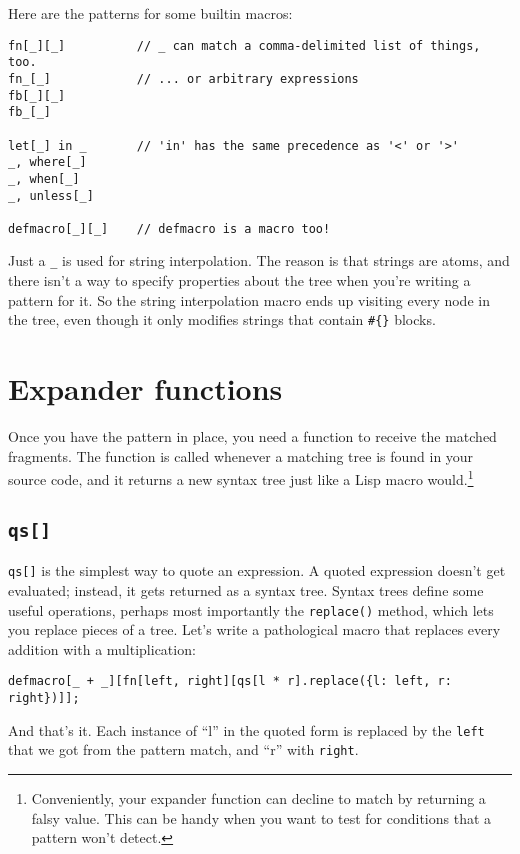 \documentclass{report}
\begin{document}
    Here are the patterns for some builtin macros:

\begin{verbatim}
fn[_][_]          // _ can match a comma-delimited list of things, too.
fn_[_]            // ... or arbitrary expressions
fb[_][_]
fb_[_]

let[_] in _       // 'in' has the same precedence as '<' or '>'
_, where[_]
_, when[_]
_, unless[_]

defmacro[_][_]    // defmacro is a macro too!
\end{verbatim}

    Just a \verb|_| is used for string interpolation. The reason is that strings are atoms, and there isn't a way to specify properties about the tree when you're writing a pattern for it. So
    the string interpolation macro ends up visiting every node in the tree, even though it only modifies strings that contain \verb|#{}| blocks.

\section{Expander functions}\label{sec:defining-macros-expander-functions}
    Once you have the pattern in place, you need a function to receive the matched fragments. The function is called whenever a matching tree is found in your source code, and it returns a new
    syntax tree just like a Lisp macro would.\footnote{Conveniently, your expander function can decline to match by returning a falsy value. This can be handy when you want to test for
    conditions that a pattern won't detect.}

\subsection{{\tt qs[]}}\label{sec:defining-macros-expander-functions-qs}
      {\tt qs[]} is the simplest way to quote an expression. A quoted expression doesn't get evaluated; instead, it gets returned as a syntax tree. Syntax trees define some useful operations,
      perhaps most importantly the {\tt replace()} method, which lets you replace pieces of a tree. Let's write a pathological macro that replaces every addition with a multiplication:

\begin{verbatim}
defmacro[_ + _][fn[left, right][qs[l * r].replace({l: left, r: right})]];
\end{verbatim}

      And that's it. Each instance of ``l'' in the quoted form is replaced by the {\tt left} that we got from the pattern match, and ``r'' with {\tt right}.
\end{document}
